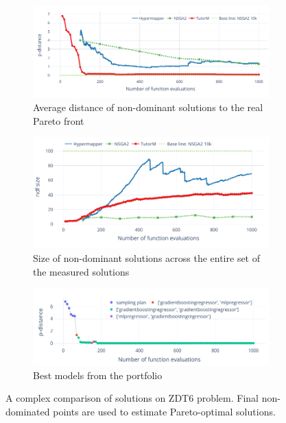             \begin{figure}
                \centering
                \begin{subfigure}{\textwidth}
                    \includegraphics[width=\textwidth]{content/images/zdt6_dist}
                    \caption{Average distance of non-dominant solutions to the real Pareto front}
                    \label{fig:zdt6_dist}
                \end{subfigure} 
                \begin{subfigure}{\textwidth}
                    \includegraphics[width=\textwidth]{content/images/zdt6_ndf}
                    \caption{Size of non-dominant solutions across the entire set of the measured solutions}
                    \label{fig:zdt6_ndf}
                \end{subfigure} 

                \begin{subfigure}{\textwidth}
                    \includegraphics[width=\textwidth]{content/images/zdt6_models}
                    \caption{Best models from the portfolio}
                    \label{fig:zdt6_models}
                \end{subfigure} 

                \caption[Comparison of solutions on ZDT6 problem]{A complex comparison of solutions on ZDT6 problem. Final non-dominated points are used to estimate Pareto-optimal solutions.}
                \label{fig:zdt6_runtime}    
            \end{figure}
